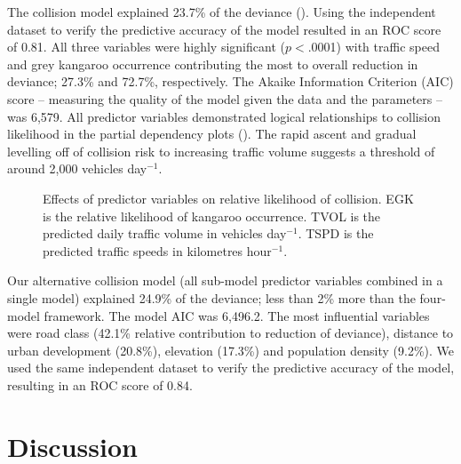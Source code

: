 The collision model explained 23.7\% of the deviance (). Using the independent dataset to verify the predictive accuracy of the model resulted in an ROC score of 0.81.  All three variables were highly significant ($p<$.0001) with traffic speed and grey kangaroo occurrence contributing the most to overall reduction in deviance; 27.3\% and 72.7\%, respectively.  The Akaike Information Criterion (AIC) score -- measuring the quality of the model given the data and the parameters -- was 6,579.  All predictor variables demonstrated logical relationships to collision likelihood in the partial dependency plots (). The rapid ascent and gradual levelling off of collision risk to increasing traffic volume suggests a threshold of around 2,000 vehicles day$^{-1}$.

\begin{figure*}[!t]
  \centering
  \caption[Effects of predictor variables on relative likelihood of collision]{Effects of predictor variables on relative likelihood of collision. EGK is the relative likelihood of kangaroo occurrence. TVOL is the predicted daily traffic volume in vehicles day$^{-1}$. TSPD is the predicted traffic speeds in kilometres hour$^{-1}$.}
  \label{egk_effects}
\end{figure*}

Our alternative collision model (all sub-model predictor variables combined in a single model) explained 24.9\% of the deviance; less than 2\% more than the four-model framework.  The model AIC was 6,496.2. The most influential variables were road class (42.1\% relative contribution to reduction of deviance), distance to urban development (20.8\%), elevation (17.3\%) and population density (9.2\%). We used the same independent dataset to verify the predictive accuracy of the model, resulting in an ROC score of 0.84.

\section{Discussion}

